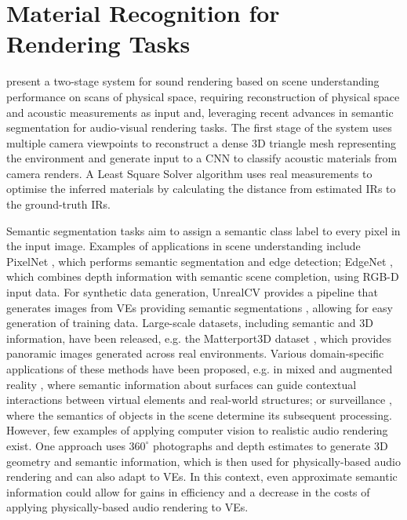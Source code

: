\section{Material Recognition for Rendering Tasks}
\cite{schissler2017acoustic} present a two-stage system for sound rendering based on scene understanding performance on scans of physical space, requiring reconstruction of physical space and acoustic measurements as input and, leveraging recent advances in semantic segmentation for audio-visual rendering tasks. The first stage of the system uses multiple camera viewpoints to reconstruct a dense 3D triangle mesh representing the environment and generate input to a CNN to classify acoustic materials from camera renders. A Least Square Solver algorithm uses real measurements to optimise the inferred materials by calculating the distance from estimated IRs to the ground-truth IRs.\par
Semantic segmentation tasks aim to assign a semantic class label to every pixel in the input image. Examples of applications in scene understanding include PixelNet \cite{bansal2016pixelnet}, which performs semantic segmentation and edge detection; EdgeNet \cite{dourado2019edgenet}, which combines depth information with semantic scene completion, using RGB-D input data. For synthetic data generation, UnrealCV provides a pipeline that generates images from VEs providing semantic segmentations \cite{qiu2016unrealcv}, allowing for easy generation of training data.
Large-scale datasets, including semantic and 3D information, have been released, e.g. the Matterport3D dataset \cite{chang2017matterport3d}, which provides panoramic images generated across real environments. 
Various domain-specific applications of these methods have been proposed, e.g. in mixed and augmented reality \cite{chen2018context}, where semantic information about surfaces can guide contextual interactions between virtual elements and real-world structures; or surveillance \cite{mao2018aic2018}, where the semantics of objects in the scene determine its subsequent processing. 
However, few examples of applying computer vision to realistic audio rendering exist. One approach \cite{kim2019immersive} uses $360^{\circ}$ photographs and depth estimates to generate 3D geometry and semantic information, which is then used for physically-based audio rendering and can also adapt to VEs. In this context, even approximate semantic information could allow for gains in efficiency and a decrease in the costs of applying physically-based audio rendering to VEs.

